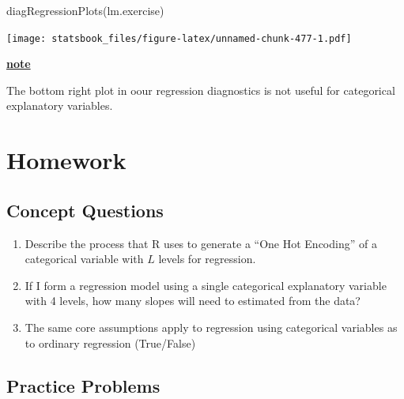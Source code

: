 \documentclass[
]{book}
\newenvironment{Shaded}{\begin{snugshade}}{\end{snugshade}}
\newcommand{\FunctionTok}[1]{\textcolor[rgb]{0.00,0.00,0.00}{#1}}
\newcommand{\NormalTok}[1]{#1}
\newenvironment{rmdblock}[1]
  {\begin{shaded*}
  \centerline{\underline{\textbf{#1}}}

  }
  {
  \end{shaded*}
  }
\newenvironment{note}
  {\begin{rmdblock}{note}}
  {\end{rmdblock}}
\theoremstyle{definition}
\theoremstyle{definition}
\theoremstyle{definition}
\theoremstyle{definition}
\theoremstyle{remark}
\begin{document}
\begin{Shaded}
\begin{Highlighting}[]
\FunctionTok{diagRegressionPlots}\NormalTok{(lm.exercise)}
\end{Highlighting}
\end{Shaded}

\texttt{[image: statsbook\_files/figure-latex/unnamed-chunk-477-1.pdf]}
\begin{note}
The bottom right plot in oour regression diagnostics is not useful for categorical explanatory variables.
\end{note}

\hypertarget{homework-10}{%
\section{Homework}\label{homework-10}}

\hypertarget{concept-questions-9}{%
\subsection{Concept Questions}\label{concept-questions-9}}

\begin{enumerate}
\def\labelenumi{\arabic{enumi}.}
\item
  Describe the process that R uses to generate a ``One Hot Encoding'' of a categorical variable with \(L\) levels for regression.
\item
  If I form a regression model using a single categorical explanatory variable with 4 levels, how many slopes will need to estimated from the data?
\item
  The same core assumptions apply to regression using categorical variables as to ordinary regression (True/False)
\end{enumerate}

\hypertarget{practice-problems-10}{%
\subsection{Practice Problems}\label{practice-problems-10}}
\end{document}
